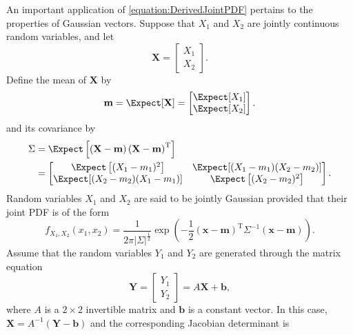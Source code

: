 \begin{example}
An important application of \eqref{equation:DerivedJointPDF} pertains to the properties of Gaussian vectors.
Suppose that $X_1$ and $X_2$ are jointly continuous random variables, and let
\begin{equation*}
\mathbf{X} = \begin{bmatrix} X_1 \\ X_2 \end{bmatrix} .
\end{equation*}
Define the mean of $\mathbf{X}$ by
\begin{equation*}
\mathbf{m} = \Expect [\mathbf{X}] 
= \begin{bmatrix} \Expect[ X_1 ] \\ \Expect[ X_2 ] \end{bmatrix} .
\end{equation*}
and its covariance by
\begin{equation*}
\begin{split}
\Sigma &= \Expect \left[ \left( \mathbf{X} - \mathbf{m} \right)
\left(\mathbf{X} - \mathbf{m} \right)^{\mathrm{T}} \right] \\
&= \begin{bmatrix} \Expect \left[ (X_1 - m_1)^2 \right] &
\Expect[ (X_1 - m_1) (X_2 - m_2) ]  \\
\Expect[ (X_2 - m_2) (X_1 - m_1) ] &
\Expect \left[ (X_2 - m_2)^2 \right] \end{bmatrix} .
\end{split}
\end{equation*}
Random variables $X_1$ and $X_2$ are said to be jointly Gaussian provided that their joint PDF is of the form
\begin{equation*}
f_{X_1, X_2} (x_1, x_2) = \frac{1}{2 \pi |\Sigma|^{\frac{1}{2}}}
\exp \left( - \frac{1}{2} \left( \mathbf{x} - \mathbf{m} \right)^{\mathrm{T}} \Sigma^{-1} \left( \mathbf{x} - \mathbf{m} \right) \right) .
\end{equation*}
Assume that the random variables $Y_1$ and $Y_2$ are generated through the matrix equation
\begin{equation*}
\mathbf{Y} = \begin{bmatrix} Y_1 \\ Y_2 \end{bmatrix}
= A \mathbf{X} + \mathbf{b} ,
\end{equation*}
where $A$ is a $2 \times 2$ invertible matrix and $\mathbf{b}$ is a constant vector.
In this case, $\mathbf{X} = A^{-1} \left( \mathbf{Y} - \mathbf{b} \right)$ and the corresponding Jacobian determinant is

\end{example}
